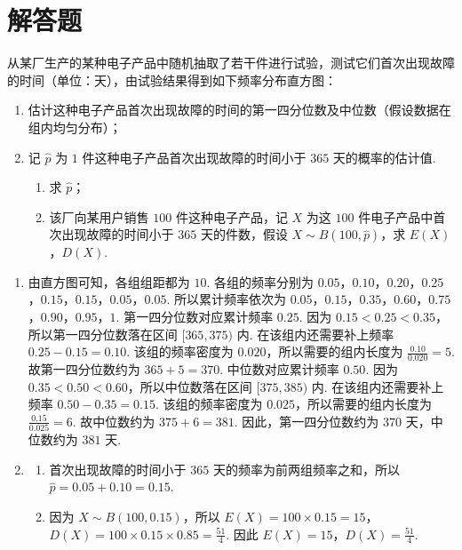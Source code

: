 \section{解答题}

\begin{problem}
从某厂生产的某种电子产品中随机抽取了若干件进行试验，测试它们首次出现故障的时间（单位：天），由试验结果得到如下频率分布直方图：

\begin{enumerate}
\item 估计这种电子产品首次出现故障的时间的第一四分位数及中位数（假设数据在组内均匀分布）；
\item 记 \(\hat{p}\) 为 \(1\) 件这种电子产品首次出现故障的时间小于 \(365\) 天的概率的估计值.
    \begin{enumerate}
    \item 求 \(\hat{p}\)；
    \item 该厂向某用户销售 \(100\) 件这种电子产品，记 \(X\) 为这 \(100\) 件电子产品中首次出现故障的时间小于 \(365\) 天的件数，假设 \(X\sim B\left( 100,\hat{p} \right)\)，求 \(E\left( X \right)\)，\(D\left( X \right)\).
    \end{enumerate}
\end{enumerate}

\end{problem}

\begin{solution}
\begin{enumerate}
\item 由直方图可知，各组组距都为 \(10\). 各组的频率分别为 \(0.05\)，\(0.10\)，\(0.20\)，\(0.25\)，\(0.15\)，\(0.15\)，\(0.05\)，\(0.05\).
所以累计频率依次为 \(0.05\)，\(0.15\)，\(0.35\)，\(0.60\)，\(0.75\)，\(0.90\)，\(0.95\)，\(1\).
第一四分位数对应累计频率 \(0.25\). 因为 \(0.15<0.25<0.35\)，所以第一四分位数落在区间 \([365,375)\) 内. 在该组内还需要补上频率 \(0.25-0.15=0.10\). 该组的频率密度为 \(0.020\)，所以需要的组内长度为 \(\frac{0.10}{0.020}=5\). 故第一四分位数约为 \(365+5=370\).
中位数对应累计频率 \(0.50\). 因为 \(0.35<0.50<0.60\)，所以中位数落在区间 \([375,385)\) 内. 在该组内还需要补上频率 \(0.50-0.35=0.15\). 该组的频率密度为 \(0.025\)，所以需要的组内长度为 \(\frac{0.15}{0.025}=6\). 故中位数约为 \(375+6=381\).
因此，第一四分位数约为 \(370\) 天，中位数约为 \(381\) 天.

\item
    \begin{enumerate}
    \item 首次出现故障的时间小于 \(365\) 天的频率为前两组频率之和，所以 \(\hat{p}=0.05+0.10=0.15\).

    \item 因为 \(X\sim B\left( 100,0.15 \right)\)，所以 \(E(X)=100\times 0.15=15\)，\(D(X)=100\times 0.15\times 0.85=\frac{51}{4}\). 因此 \(E(X)=15\)，\(D(X)=\frac{51}{4}\).
    \end{enumerate}
\end{enumerate}
\end{solution}

